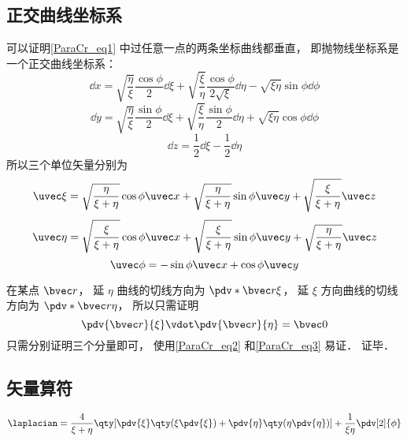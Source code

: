 \subsection{正交曲线坐标系}
可以证明\autoref{ParaCr_eq1} 中过任意一点的两条坐标曲线都垂直， 即抛物线坐标系是一个正交曲线坐标系：
\begin{equation}
\dd{x} = \sqrt{\frac{\eta}{\xi}}\frac{\cos\phi}{2}\dd{\xi} + \sqrt{\frac{\xi}{\eta}}\frac{\cos\phi}{2\sqrt{\xi}}\dd{\eta} - \sqrt{\xi\eta}\sin\phi\dd{\phi}
\end{equation}
\begin{equation}
\dd{y} = \sqrt{\frac{\eta}{\xi}}\frac{\sin\phi}{2}\dd{\xi} + \sqrt{\frac{\xi}{\eta}}\frac{\sin\phi}{2}\dd{\eta} + \sqrt{\xi\eta}\cos\phi\dd{\phi}
\end{equation}
\begin{equation}
\dd{z} = \frac{1}{2}\dd{\xi} - \frac{1}{2}\dd{\eta}
\end{equation}
所以三个单位矢量分别为
\begin{equation}
\uvec \xi = \sqrt{\frac{\eta}{\xi+\eta}}\cos\phi\uvec x + \sqrt{\frac{\eta}{\xi+\eta}}\sin\phi\uvec y + \sqrt{\frac{\xi}{\xi+\eta}}\uvec z
\end{equation}
\begin{equation}
\uvec \eta = \sqrt{\frac{\xi}{\xi+\eta}}\cos\phi\uvec x + \sqrt{\frac{\xi}{\xi+\eta}}\sin\phi\uvec y + \sqrt{\frac{\eta}{\xi+\eta}}\uvec z
\end{equation}
\begin{equation}
\uvec \phi = -\sin\phi \uvec x + \cos\phi \uvec y
\end{equation}


在某点 $\bvec r$， 延 $\eta$ 曲线的切线方向为 $\pdv*{\bvec r}{\xi}$， 延 $\xi$ 方向曲线的切线方向为 $\pdv*{\bvec r}{\eta}$， 所以只需证明
\begin{equation}
\pdv{\bvec r}{\xi} \vdot \pdv{\bvec r}{\eta} = \bvec 0
\end{equation}
只需分别证明三个分量即可， 使用\autoref{ParaCr_eq2} 和\autoref{ParaCr_eq3} 易证． 证毕．

\subsection{矢量算符}
\begin{equation}
\laplacian = \frac{4}{\xi + \eta} \qty[\pdv{\xi}\qty(\xi\pdv{\xi}) + \pdv{\eta}\qty(\eta\pdv{\eta})] + \frac{1}{\xi\eta}\pdv[2]{\phi}
\end{equation}
